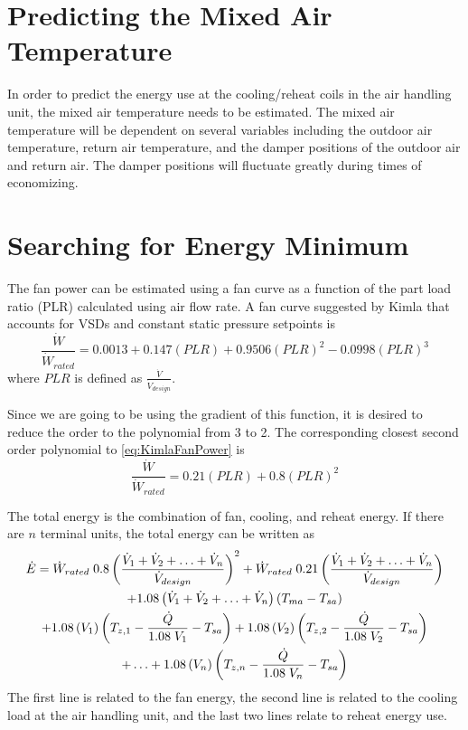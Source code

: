\section{Predicting the Mixed Air Temperature}

In order to predict the energy use at the cooling/reheat coils in the air handling unit, the mixed air temperature needs to be estimated. The mixed air temperature will be dependent on several variables including the outdoor air temperature, return air temperature, and the damper positions of the outdoor air and return air. The damper positions will fluctuate greatly during times of economizing.  


\section{Searching for Energy Minimum}

The fan power can be estimated using a fan curve as a function of the part load ratio (PLR) calculated using air flow rate. A fan curve suggested by Kimla that accounts for VSDs and constant static pressure setpoints is
\begin{equation}\label{eq:KimlaFanPower}
\frac{\dot{W}}{\dot{W}_{rated}} = 0.0013+0.147\left(PLR \right)+0.9506\left(PLR \right)^2-0.0998\left(PLR \right)^3
\end{equation}
where \(PLR\) is defined as \(\frac{\dot{V}}{\dot{V}_{design}}\).

Since we are going to be using the gradient of this function, it is desired to reduce the order to the polynomial from 3 to 2. The corresponding closest second order polynomial to \ref{eq:KimlaFanPower} is
\begin{equation}\label{eq:finalFanPower}
\frac{\dot{W}}{\dot{W}_{rated}} = 0.21\left(PLR \right)+0.8\left(PLR \right)^2
\end{equation}

The total energy is the combination of fan, cooling, and reheat energy. If there are \(n\) terminal units, the total energy can be written as
\begin{multline}\label{eq:totalEnergy}
\dot{E}=\dot{W}_{rated}\;0.8 \left(\frac{\dot{V}_{1}+\dot{V}_{2}+\ldots+\dot{V}_{n}}{\dot{V}_{design}} \right)^2 + \dot{W}_{rated}\;0.21 \left(\frac{\dot{V}_{1}+\dot{V}_{2}+\ldots+\dot{V}_{n}}{\dot{V}_{design}} \right)\\
+1.08\left(\dot{V}_{1}+\dot{V}_{2}+\ldots+\dot{V}_{n} \right)\left(T_{ma}-T_{sa} \right)\\
+1.08\left(V_1 \right)\left(T_{z,1}-\frac{\dot{Q}}{1.08\; V_1} -T_{sa}\right) +1.08\left(V_2 \right)\left(T_{z,2}-\frac{\dot{Q}}{1.08\; V_2} -T_{sa}\right)\\ 
+\ldots+1.08\left(V_n \right)\left(T_{z,n}-\frac{\dot{Q}}{1.08\; V_n} -T_{sa}\right) 
\end{multline}
The first line is related to the fan energy, the second line is related to the cooling load at the air handling unit, and the last two lines relate to reheat energy use. 

